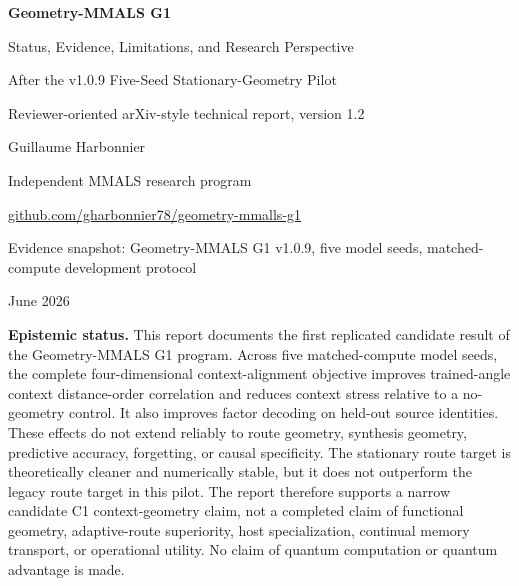 \documentclass[11pt,a4paper]{article}
\begin{document}
\begin{titlepage}
\centering
\vspace*{0.9cm}
{\Huge\bfseries\color{deepblue} Geometry-MMALS G1\par}
\vspace{0.25cm}
{\LARGE Status, Evidence, Limitations, and Research Perspective\par}
\vspace{0.3cm}
{\Large After the v1.0.9 Five-Seed Stationary-Geometry Pilot\par}
\vspace{0.45cm}
{\large Reviewer-oriented arXiv-style technical report, version 1.2\par}
\vspace{1.0cm}
{\Large Guillaume Harbonnier\par}
\vspace{0.2cm}
{\normalsize Independent MMALS research program\par}
\vspace{0.15cm}
{\normalsize \href{https://github.com/gharbonnier78/geometry-mmalls-g1}{github.com/gharbonnier78/geometry-mmalls-g1}\par}
\vspace{0.7cm}
{\normalsize Evidence snapshot: Geometry-MMALS G1 v1.0.9, five model seeds, matched-compute development protocol\par}
{\normalsize June 2026\par}
\vfill
\begin{minipage}{0.92\textwidth}
\small
\textbf{Epistemic status.} This report documents the first replicated candidate result of the Geometry-MMALS G1 program. Across five matched-compute model seeds, the complete four-dimensional context-alignment objective improves trained-angle context distance-order correlation and reduces context stress relative to a no-geometry control. It also improves factor decoding on held-out source identities. These effects do not extend reliably to route geometry, synthesis geometry, predictive accuracy, forgetting, or causal specificity. The stationary route target is theoretically cleaner and numerically stable, but it does not outperform the legacy route target in this pilot. The report therefore supports a narrow candidate C1 context-geometry claim, not a completed claim of functional geometry, adaptive-route superiority, host specialization, continual memory transport, or operational utility. No claim of quantum computation or quantum advantage is made.
\end{minipage}
\vfill
\end{titlepage}
\end{document}
